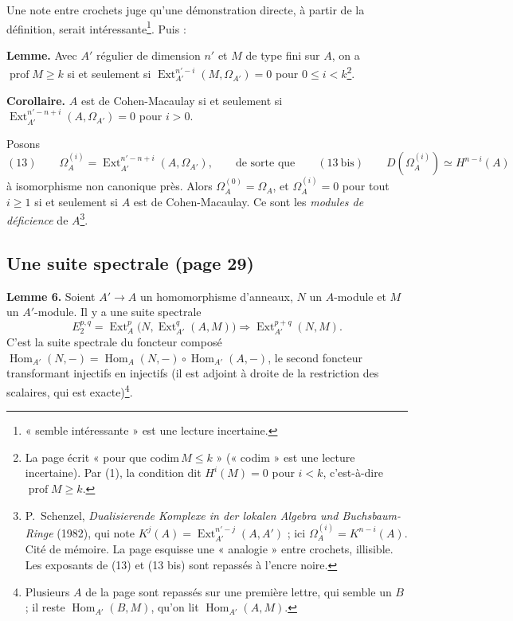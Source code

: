 \documentclass[11pt,a4paper]{article}
\begin{document}
Une note entre crochets juge qu'une démonstration directe, à partir de la
définition, serait intéressante\footnote{« semble intéressante » est une
lecture incertaine.}. Puis :

\textbf{Lemme.} Avec $A'$ régulier de dimension $n'$ et $M$ de type fini sur
$A$, on a $\operatorname{prof} M \geqslant k$ si et seulement si
$\operatorname{Ext}^{n'-i}_{A'}(M, \Omega_{A'}) = 0$ pour $0 \leqslant i <
k$\footnote{La page écrit « pour que $\mathrm{codim}\, M \leq k$ »
(« codim » est une lecture incertaine). Par (1), la condition dit
$H^i(M) = 0$ pour $i < k$, c'est-à-dire $\operatorname{prof} M \geqslant k$.}.

\textbf{Corollaire.} $A$ est de Cohen-Macaulay si et seulement si
$\operatorname{Ext}^{n'-n+i}_{A'}(A, \Omega_{A'}) = 0$ pour $i > 0$.

Posons
\[
  (13) \qquad \Omega_A^{(i)} = \operatorname{Ext}^{n'-n+i}_{A'}(A, \Omega_{A'}),
  \qquad\text{de sorte que}\qquad
  (13\ \text{bis}) \qquad D(\Omega_A^{(i)}) \simeq H^{n-i}(A)
\]
à isomorphisme non canonique près. Alors $\Omega_A^{(0)} = \Omega_A$, et
$\Omega_A^{(i)} = 0$ pour tout $i \geqslant 1$ si et seulement si $A$ est de
Cohen-Macaulay. Ce sont les \emph{modules de déficience} de
$A$\footnote{P.~Schenzel, \emph{Dualisierende Komplexe in der lokalen Algebra
und Buchsbaum-Ringe} (1982), qui note $K^{j}(A) =
\operatorname{Ext}^{n'-j}_{A'}(A, A')$ ; ici $\Omega_A^{(i)} = K^{n-i}(A)$. Cité
de mémoire. La page esquisse une « analogie » entre crochets, illisible. Les
exposants de (13) et (13 bis) sont repassés à l'encre noire.}.

\subsection*{Une suite spectrale (page 29)}

\textbf{Lemme 6.} Soient $A' \to A$ un homomorphisme d'anneaux, $N$ un
$A$-module et $M$ un $A'$-module. Il y a une suite spectrale
\[
  E_2^{p,q} = \operatorname{Ext}^p_A\bigl(N, \operatorname{Ext}^q_{A'}(A, M)\bigr)
  \Rightarrow \operatorname{Ext}^{p+q}_{A'}(N, M).
\]
C'est la suite spectrale du foncteur composé $\operatorname{Hom}_{A'}(N, -) =
\operatorname{Hom}_A(N, -) \circ \operatorname{Hom}_{A'}(A, -)$, le second
foncteur transformant injectifs en injectifs (il est adjoint à droite de la
restriction des scalaires, qui est exacte)\footnote{Plusieurs $A$ de la page
sont repassés sur une première lettre, qui semble un $B$ ; il reste
$\operatorname{Hom}_{A'}(B, M)$, qu'on lit $\operatorname{Hom}_{A'}(A, M)$.}.
\end{document}
